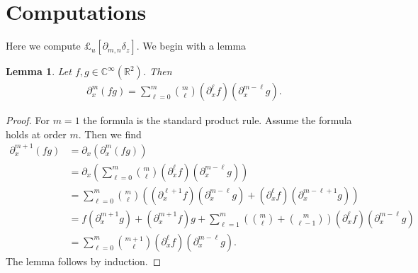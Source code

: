 \documentclass[12pt]{amsart}
\newcommand{\R}{\ensuremath{\mathbb{R}}}
\newtheorem{lem}[thm]{Lemma}
\begin{document}
\appendix
\section{Computations}
\label{app:computation}

Here we compute $\pounds_u [\partial_{m,n} \delta_z]$.
We begin with a lemma
\begin{lem}
  Let $f,g \in \mathbb{C}^\infty(\R^2)$.  Then
  \begin{align*}
    \partial_x^m ( fg) = \sum_{\ell=0}^{m} \binom{m}{\ell} (\partial_x^\ell f)(\partial_x^{m-\ell}g).
  \end{align*}
\end{lem}
\begin{proof}
  For $m=1$ the formula is the standard product rule.
  Assume the formula holds at order $m$.
  Then we find
  \begin{align*}
    \partial_x^{m+1} (fg) &= \partial_x ( \partial_x^{m}(fg)) \\
    &= \partial_x \left( \sum_{\ell=0}^{m} \binom{m}{\ell} (\partial_x^\ell f)(\partial_x^{m-\ell}g) \right) \\
    &= \sum_{\ell=0}^{m} \binom{m}{\ell}\left(
      ( \partial_x^{\ell + 1} f) (\partial_x^{m-\ell}g) 
      + ( \partial_x^{\ell} f) (\partial_x^{m-\ell+1}g)
      \right) \\
     &= f (\partial_x^{m+1}g) +(\partial_x^{m+1}f) g + \sum_{\ell=1}^{m} \left( \binom{m}{\ell} + \binom{m}{\ell-1} \right) (\partial_x^\ell f)(\partial_x^{m-\ell}g) \\
     &= \sum_{\ell=0}^{m} \binom{m+1}{\ell} (\partial_x^\ell f)(\partial_x^{m-\ell}g).
  \end{align*}
  The lemma follows by induction.
\end{proof}
\end{document}
